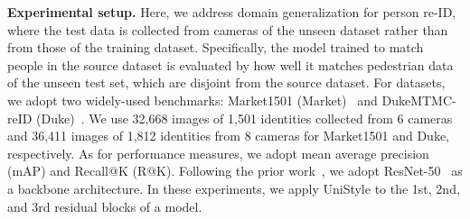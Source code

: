 \documentclass[runningheads]{llncs}
\begin{document}
\noindent \textbf{Experimental setup.}
Here, we address domain generalization for person re-ID, where the test data is collected from cameras of the unseen dataset rather than from those of the training dataset. Specifically, the model trained to match people in the source dataset is evaluated by how well it matches pedestrian data of the unseen test set, which are disjoint from the source dataset. For datasets, we adopt two widely-used benchmarks: Market1501 (Market)~\cite{zheng2015scalable} and DukeMTMC-reID (Duke)~\cite{ristani2016performance,zheng2017unlabeled}. We use 32,668 images of 1,501 identities collected from 6 cameras and 36,411 images of 1,812 identities from 8 cameras for Market1501 and Duke, respectively. As for performance measures, we adopt mean average precision (mAP) and Recall@K (R@K). Following the prior work~\cite{zhou2021domain}, we adopt ResNet-50~\cite{resnet} as a backbone architecture. In these experiments, we apply UniStyle to the 1st, 2nd, and 3rd residual blocks of a model.





























    
\end{document}
